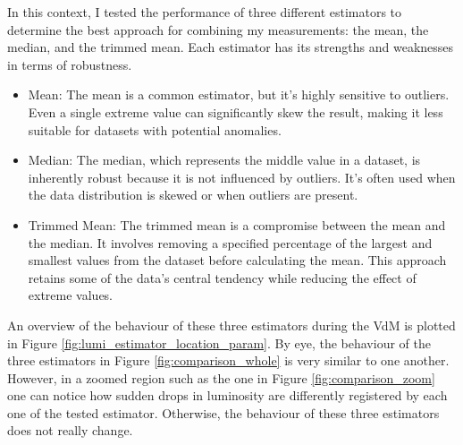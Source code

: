 In this context, I tested the performance of three different estimators to determine the best approach for combining my measurements: the mean, the median, and the trimmed mean. Each estimator has its strengths and weaknesses in terms of robustness.

\begin{itemize}
\item Mean: The mean is a common estimator, but it's highly sensitive to outliers. Even a single extreme value can significantly skew the result, making it less suitable for datasets with potential anomalies.
\item Median: The median, which represents the middle value in a dataset, is inherently robust because it is not influenced by outliers. It's often used when the data distribution is skewed or when outliers are present.
\item Trimmed Mean: The trimmed mean is a compromise between the mean and the median. It involves removing a specified percentage of the largest and smallest values from the dataset before calculating the mean. This approach retains some of the data's central tendency while reducing the effect of extreme values.
\end{itemize}


An overview of the behaviour of these three estimators during the VdM is plotted in Figure \ref{fig:lumi_estimator_location_param}. By eye, the behaviour of the three estimators in Figure \ref{fig:comparison_whole} is very similar to one another. However, in a zoomed region such as the one in Figure \ref{fig:comparison_zoom} one can notice how sudden drops in luminosity are differently registered by each one of the tested estimator. Otherwise, the behaviour of these three estimators does not really change.
 


